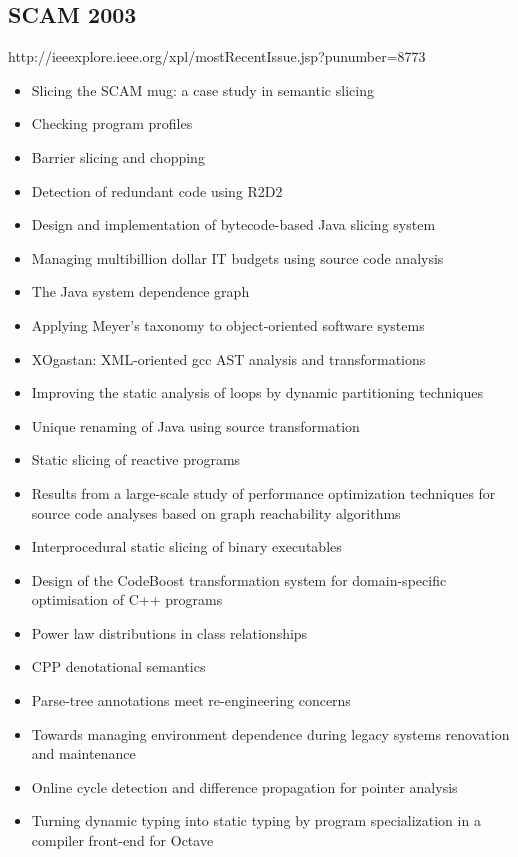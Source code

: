 \subsection{SCAM 2003}

http://ieeexplore.ieee.org/xpl/mostRecentIssue.jsp?punumber=8773

{\small
\begin{itemize}[itemsep=-1ex]
  \item Slicing the SCAM mug: a case study in semantic slicing
  \item Checking program profiles
  \item Barrier slicing and chopping
  \item Detection of redundant code using R2D2
  \item Design and implementation of bytecode-based Java slicing system
  \item Managing multibillion dollar IT budgets using source code analysis
  \item The Java system dependence graph
  \item Applying Meyer's taxonomy to object-oriented software systems
  \item XOgastan: XML-oriented gcc AST analysis and transformations
  \item Improving the static analysis of loops by dynamic partitioning techniques
  \item Unique renaming of Java using source transformation
  \item Static slicing of reactive programs
  \item Results from a large-scale study of performance optimization techniques for source code analyses based on graph reachability algorithms
  \item Interprocedural static slicing of binary executables
  \item Design of the CodeBoost transformation system for domain-specific optimisation of C++ programs
  \item Power law distributions in class relationships
  \item CPP denotational semantics
  \item Parse-tree annotations meet re-engineering concerns
  \item Towards managing environment dependence during legacy systems renovation and maintenance
  \item Online cycle detection and difference propagation for pointer analysis
  \item Turning dynamic typing into static typing by program specialization in a compiler front-end for Octave
\end{itemize}
}

